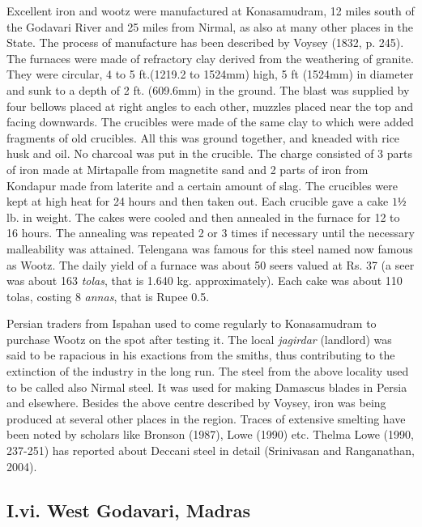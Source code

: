 Excellent iron and wootz were manufactured at Konasamudram, 12 miles south of the Godavari River and 25 miles from Nirmal, as also at many other places in the State. The process of manufacture has been described by Voysey (1832, p. 245). The furnaces were made of refractory clay derived from the weathering of granite.  They were circular, 4 to 5 ft.(1219.2 to 1524mm) high, 5 ft (1524mm) in diameter and sunk to a depth of 2 ft. (609.6mm) in the ground.  The blast was supplied by four bellows placed at right angles to each other, muzzles placed near the top and facing downwards.  The crucibles were made of the same clay to which were added fragments of old crucibles. All this was ground together, and kneaded with rice husk and oil. No charcoal was put in the crucible.  The charge consisted of 3 parts of iron made at Mirtapalle from magnetite sand and 2 parts of iron from Kondapur made from laterite and a certain amount of slag.  The crucibles were kept at high heat for 24 hours and then taken out.  Each crucible gave a cake $1½$ lb. in weight.  The cakes were cooled and then annealed in the furnace for 12 to 16 hours.  The annealing was repeated 2 or 3 times if necessary until the necessary malleability was attained.  Telengana was famous for this steel named   now famous as Wootz.  The daily yield of a furnace was about 50 seers valued at Rs. 37 (a seer was about 163 {\it tolas}, that is 1.640 kg. approximately). Each cake was about 110 tolas, costing 8 {\it annas}, that is Rupee 0.5.

Persian traders from Ispahan used to come regularly to Konasamudram to purchase Wootz on the spot after testing it.  The local {\it jagirdar} (landlord) was said to be rapacious in his exactions from the smiths, thus contributing to the extinction of the industry in the long run. The steel from the above locality used to be called also Nirmal steel. It was used for making Damascus blades in Persia and elsewhere. Besides the above centre described by Voysey, iron was being produced at several other places in the region. Traces of extensive smelting have been noted by scholars like Bronson (1987), Lowe (1990) etc. Thelma Lowe (1990, 237-251) has reported about Deccani steel in detail (Srinivasan and Ranganathan, 2004).   

\vspace{-.1cm}

\subsection*{I.vi. West Godavari, Madras}\label{subsection-6}

